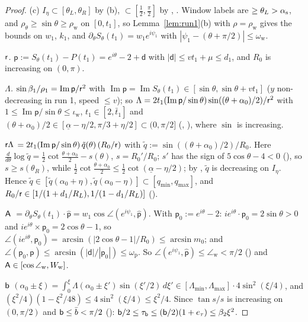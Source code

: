 \begin{proof}
(c) $I_\eta\subset[\theta_L,\theta_R]$ by (b), $\subset[\frac12,\frac\pi2]$ by , . Window labels are $\ge\theta_L>\alpha_{\mathrm s}$,
and $\rho_\theta\ge\sin\theta\ge\rho_{\mathrm w}$ on $[0,t_1]$, so Lemma~\ref{lem:run1}(b) with $\rho=\rho_{\mathrm w}$ gives the bounds on
$w_1$, $k_1$, and $\partial_\theta S_\theta(t_1)=w_1e^{i\psi_1}$ with $|\psi_1-(\theta+\pi/2)|\le\omega_{\mathrm w}$.

\emph{$\mathsf r$.} $\mathsf p:=S_\theta(t_1)-P(t_1)=e^{i\theta}-2+\mathsf d$ with $|\mathsf d|\le vt_1+\mu\le d_1$, and $R_0$ is increasing on $(0,\pi)$.

\emph{$\Lambda$.} $\sin\beta_1/\rho_1=\operatorname{Im}\mathsf p/\mathsf r^2$ with $\operatorname{Im}\mathsf p=\operatorname{Im}S_\theta(t_1)\in[\sin\theta,\sin\theta+vt_1]$
($y$ non-decreasing in run 1, speed $\le v$); so $\Lambda=2t_1(\operatorname{Im}\mathsf p/\sin\theta)\sin((\theta+\alpha_0)/2)/\mathsf r^2$ with
$1\le\operatorname{Im}\mathsf p/\sin\theta\le\iota_{\mathrm w}$, $t_1\in[2,\bar t_1]$ and
$(\theta+\alpha_0)/2\in[\underline\alpha-\eta/2,\pi/3+\eta/2]\subset(0,\pi/2]$ (, ), where $\sin$ is increasing.

\emph{$\mathsf r\Lambda$} $=2t_1(\operatorname{Im}\mathsf p/\sin\theta)\,\tilde q(\theta)\,(R_0/\mathsf r)$ with $\tilde q:=\sin((\theta+\alpha_0)/2)/R_0$. Here
$\frac d{d\theta}\log\tilde q=\frac12\cot\frac{\theta+\alpha_0}2-s(\theta)$, $s=R_0'/R_0$; $s'$ has the sign of $5\cos\theta-4<0$
(), so $s\ge s(\theta_R)$, while $\frac12\cot\frac{\theta+\alpha_0}2\le\frac12\cot(\underline\alpha-\eta/2)$; by ,
$\tilde q$ is decreasing on $I_\eta$. Hence $\tilde q\in[\tilde q(\alpha_0+\eta),\tilde q(\alpha_0-\eta)]\subset[q_{\min},q_{\max}]$, and
$R_0/\mathsf r\in[1/(1+d_1/R_L),1/(1-d_1/R_L)]$ ().

\emph{$\mathsf A$} $=\partial_\theta S_\theta(t_1)\cdot\hat{\mathsf p}=w_1\cos\angle(e^{i\psi_1},\hat{\mathsf p})$. With $\mathsf p_0:=e^{i\theta}-2$:
$ie^{i\theta}\cdot\mathsf p_0=2\sin\theta>0$ and $ie^{i\theta}\times\mathsf p_0=2\cos\theta-1$, so
$\angle(ie^{i\theta},\mathsf p_0)=\arcsin(|2\cos\theta-1|/R_0)\le\arcsin m_0$; and $\angle(\mathsf p_0,\mathsf p)\le\arcsin(|\mathsf d|/|\mathsf p_0|)\le\omega_{\mathrm p}$.
So $\angle(e^{i\psi_1},\hat{\mathsf p})\le\angle_{\mathrm w}<\pi/2$ () and $\mathsf A\in[\cos\angle_{\mathrm w},W_{\mathrm w}]$.

\emph{$\mathsf b$} $(\alpha_0\pm\xi)=\int_0^\xi\Lambda(\alpha_0\pm\xi')\sin(\xi'/2)\,d\xi'\in[\Lambda_{\min},\Lambda_{\max}]\cdot4\sin^2(\xi/4)$, and
$(\xi^2/4)(1-\xi^2/48)\le4\sin^2(\xi/4)\le\xi^2/4$. Since $\tan s/s$ is increasing on $(0,\pi/2)$ and $\mathsf b\le\bar b<\pi/2$ ():
$\mathsf b/2\le\tau_{\mathsf b}\le(\mathsf b/2)(1+e_\tau)\le\beta_2\xi^2$.


\end{proof}
